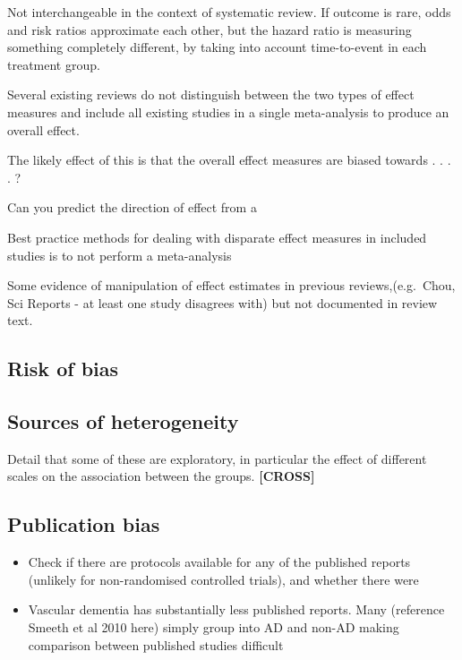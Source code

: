 \documentclass[a4paper, twoside]{templates/ociamthesis}
\providecommand{\tightlist}{%
  \setlength{\itemsep}{0pt}\setlength{\parskip}{0pt}}
\begin{document}
Not interchangeable in the context of systematic review. If outcome is rare, odds and risk ratios approximate each other, but the hazard ratio is measuring something completely different, by taking into account time-to-event in each treatment group.

Several existing reviews do not distinguish between the two types of effect measures and include all existing studies in a single meta-analysis to produce an overall effect.

The likely effect of this is that the overall effect measures are biased towards . . . . ?

Can you predict the direction of effect from a

Best practice methods for dealing with disparate effect measures in included studies is to not perform a meta-analysis

Some evidence of manipulation of effect estimates in previous reviews,(e.g.~Chou, Sci Reports - at least one study disagrees with) but not documented in review text.

\hypertarget{risk-of-bias-subheading}{%
\subsection{Risk of bias}\label{risk-of-bias-subheading}}

\hypertarget{sources-of-heterogeneity}{%
\subsection{Sources of heterogeneity}\label{sources-of-heterogeneity}}

Detail that some of these are exploratory, in particular the effect of different scales on the association between the groups. \textbf{{[}CROSS{]}}

\hypertarget{publication-bias}{%
\subsection{Publication bias}\label{publication-bias}}

\begin{itemize}
\tightlist
\item
  Check if there are protocols available for any of the published reports (unlikely for non-randomised controlled trials), and whether there were
\item
  Vascular dementia has substantially less published reports. Many (reference Smeeth et al 2010 here) simply group into AD and non-AD making comparison between published studies difficult
\end{itemize}
\end{document}
